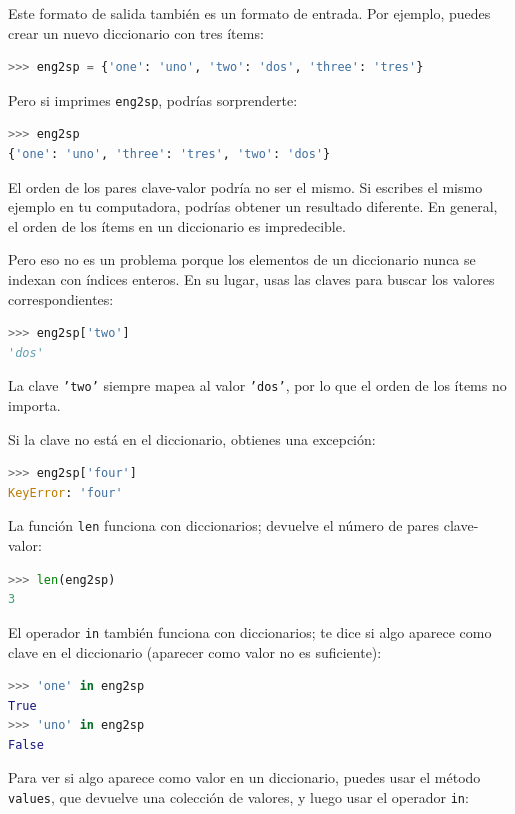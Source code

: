 Este formato de salida también es un formato de entrada. Por ejemplo, puedes crear un nuevo diccionario con tres ítems:

\begin{lstlisting}[language=Python]
>>> eng2sp = {'one': 'uno', 'two': 'dos', 'three': 'tres'}
\end{lstlisting}

Pero si imprimes \texttt{eng2sp}, podrías sorprenderte:

\begin{lstlisting}[language=Python]
>>> eng2sp
{'one': 'uno', 'three': 'tres', 'two': 'dos'}
\end{lstlisting}

El orden de los pares clave-valor podría no ser el mismo. Si escribes el mismo ejemplo en tu computadora, podrías obtener un resultado diferente. En general, el orden de los ítems en un diccionario es impredecible.

Pero eso no es un problema porque los elementos de un diccionario nunca se indexan con índices enteros. En su lugar, usas las claves para buscar los valores correspondientes:

\begin{lstlisting}[language=Python]
>>> eng2sp['two']
'dos'
\end{lstlisting}

La clave \texttt{'two'} siempre mapea al valor \texttt{'dos'}, por lo que el orden de los ítems no importa.

Si la clave no está en el diccionario, obtienes una excepción:

\begin{lstlisting}[language=Python]
>>> eng2sp['four']
KeyError: 'four'
\end{lstlisting}

La función \texttt{len} funciona con diccionarios; devuelve el número de pares clave-valor:

\begin{lstlisting}[language=Python]
>>> len(eng2sp)
3
\end{lstlisting}

El operador \texttt{in} también funciona con diccionarios; te dice si algo aparece como clave en el diccionario (aparecer como valor no es suficiente):

\begin{lstlisting}[language=Python]
>>> 'one' in eng2sp
True
>>> 'uno' in eng2sp
False
\end{lstlisting}

Para ver si algo aparece como valor en un diccionario, puedes usar el método \texttt{values}, que devuelve una colección de valores, y luego usar el operador \texttt{in}:

